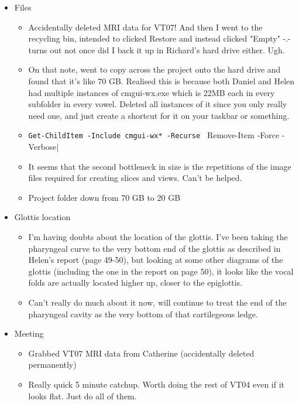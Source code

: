 \documentclass{article}
\begin{document}
\begin{itemize}
    \item Files
    \begin{itemize}
        \item Accidentally deleted MRI data for VT07! And then I went to the recycling bin, intended to clicked Restore and instead clicked "Empty" -.-  turns out not once did I back it up in Richard's hard drive either. Ugh.
        \item On that note, went to copy across the project onto the hard drive and found that it's like 70 GB. Realised this is because both Daniel and Helen had multiple instances of cmgui-wx.exe which is 22MB each in every subfolder in every vowel. Deleted all instances of it since you only really need one, and just create a shortcut for it on your taskbar or something.
        \item \verb|Get-ChildItem -Include cmgui-wx* -Recurse | Remove-Item -Force -Verbose|
        \item It seems that the second bottleneck in size is the repetitions of the image files required for creating slices and views. Can't be helped.
        \item Project folder down from 70 GB to 20 GB
    \end{itemize}
    
    \item Glottis location
    \begin{itemize}
        \item I'm having doubts about the location of the glottis. I've been taking the pharyngeal curve to the very bottom end of the glottis as described in Helen's report (page 49-50), but looking at some other diagrams of the glottis (including the one in the report on page 50), it looks like the vocal folds are actually located higher up, closer to the epiglottis. 
        \item Can't really do much about it now, will continue to treat the end of the pharyngeal cavity as the very bottom of that cartilegeous ledge. 
    \end{itemize}
    
    \item Meeting
    \begin{itemize}
        \item Grabbed VT07 MRI data from Catherine (accidentally deleted permanently)
        \item Really quick 5 minute catchup. Worth doing the rest of VT04 even if it looks flat. Just do all of them.
    \end{itemize}
    

\end{itemize}
\end{document}
